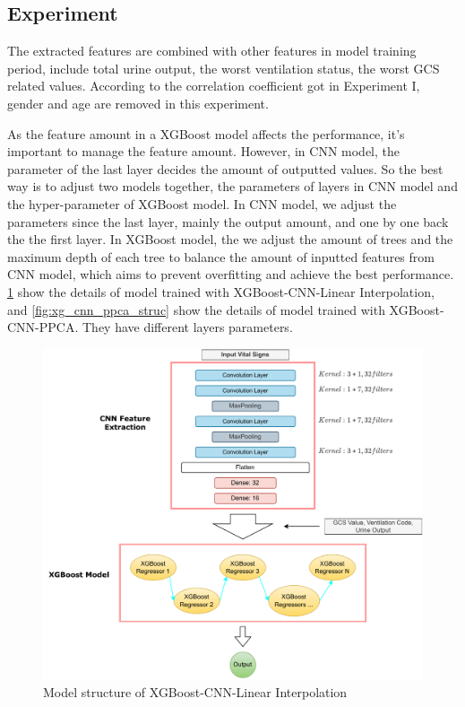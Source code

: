 \documentclass[12pt,a4paper,english
]{tunithesis}
\begin{document}
\subsection{Experiment}
The extracted features are combined with other features in model training period, include total urine output, the worst ventilation status, the worst GCS related values. According to the correlation coefficient got in Experiment I, gender and age are removed in this experiment. 

As the feature amount in a XGBoost model affects the performance, it's important to manage the feature amount. However, in CNN model, the parameter of the last layer decides the amount of outputted values. So the best way is to adjust two models together, the parameters of layers in CNN model and the hyper-parameter of XGBoost model. In CNN model, we adjust the parameters since the last layer, mainly the output amount, and one by one back the the first layer. In XGBoost model, the we adjust the amount of trees and the maximum depth of each tree to balance the amount of inputted features from CNN model, which aims to prevent overfitting and achieve the best performance. \ref{fig:xg_cnn_li_struc} show the details of model trained with XGBoost-CNN-Linear Interpolation, and \ref{fig:xg_cnn_ppca_struc} show the details of model trained with XGBoost-CNN-PPCA. They have different layers parameters.

\begin{figure}
  \begin{center}
    \includegraphics[width=1\textwidth]{thesis/img/xg_cnn_li.pdf}
  \end{center}
  \caption[XGBoost-CNN-LI model]{Model structure of XGBoost-CNN-Linear Interpolation}
  \label{fig:xg_cnn_li_struc}
\end{figure}
\end{document}
